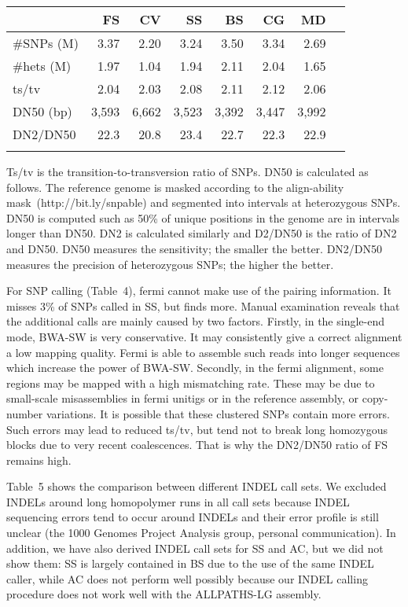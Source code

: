 \documentclass{bioinfo}
\begin{document}
\begin{table}[!htb]
{\begin{tabular}{p{2.3cm}rrrrrrr}
\toprule
& FS & CV & SS & BS & CG & MD \\
\midrule
\#SNPs (M) & 3.37 & 2.20 & 3.24 & 3.50 & 3.34 & 2.69\\
\#hets (M) & 1.97 & 1.04 & 1.94 & 2.11 & 2.04 & 1.65\\
ts/tv      & 2.04 & 2.03 & 2.08 & 2.11 & 2.12 & 2.06\\
DN50 (bp)  & 3,593& 6,662& 3,523& 3,392& 3,447&3,992\\
DN2/DN50   & 22.3 & 20.8 & 23.4 & 22.7 & 22.3 & 22.9\\
\botrule
\end{tabular}}{Ts/tv is the transition-to-transversion ratio of SNPs. DN50 is
calculated as follows. The reference genome is masked according to the
align-ability mask~(http://bit.ly/snpable) and segmented into intervals at
heterozygous SNPs. DN50 is computed such as 50\% of unique positions in the
genome are in intervals longer than DN50. DN2 is calculated similarly and
D2/DN50 is the ratio of DN2 and DN50. DN50 measures the sensitivity; the
smaller the better.  DN2/DN50 measures the precision of heterozygous SNPs; the
higher the better.}

\end{table}

For SNP calling (Table~4), fermi cannot make use of the pairing information. It
misses 3\% of SNPs called in SS, but finds more. Manual examination reveals that
the additional calls are mainly caused by two factors. Firstly, in the
single-end mode, BWA-SW is very conservative. It may consistently give a
correct alignment a low mapping quality. Fermi is able to assemble such reads into
longer sequences which increase the power of BWA-SW. Secondly, in the fermi
alignment, some regions may be mapped with a high mismatching rate.  These may
be due to small-scale misassemblies in fermi unitigs or in the reference
assembly, or copy-number variations. It is possible that these clustered
SNPs contain more errors. Such errors may lead to reduced ts/tv, but tend
not to break long homozygous blocks due to very recent coalescences. That
is why the DN2/DN50 ratio of FS remains high.

Table~5 shows the comparison between different INDEL call sets. We excluded
INDELs around long homopolymer runs in all call sets because INDEL sequencing
errors tend to occur around INDELs and their error profile is still unclear
(the 1000 Genomes Project Analysis group, personal communication). In addition,
we have also derived INDEL call sets for SS and AC, but we did not show them:
SS is largely contained in BS due to the use of the same INDEL caller, while AC
does not perform well possibly because our INDEL calling procedure does not
work well with the ALLPATHS-LG assembly.
\end{document}
